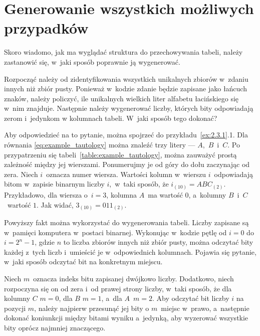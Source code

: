 \documentclass{SGGW-thesis}
\begin{document}
\section{Generowanie wszystkich możliwych przypadków}

\begin{paragraph}{}
    Skoro wiadomo, jak ma wyglądać struktura do przechowywania tabeli, należy zastanowić się, w~jaki sposób poprawnie ją wygenerować.

    Rozpocząć należy od zidentyfikowania wszystkich unikalnych zbiorów w~zdaniu innych niż zbiór pusty. Ponieważ w~kodzie zdanie będzie zapisane jako łańcuch znaków, należy policzyć, ile unikalnych wielkich liter alfabetu łacińskiego się w~nim znajduje. Następnie należy wygenerować liczby, których bity odpowiadają zerom i~jedynkom w kolumnach tabeli. W~jaki sposób tego dokonać?

    Aby odpowiedzieć na to pytanie, można spojrzeć do przykładu~\ref{ex:2.3.1}.1. Dla równania \eqref{eq:example_tautology} można znaleźć trzy litery --- $A$,~$B$~i~$C$. Po przypatrzeniu się tabeli~\ref{table:example_tautology}, można zauważyć prostą zależność między jej wierszami. Ponumerujmy je od góry do dołu zaczynając od zera. Niech $i$~oznacza numer wiersza. Wartości kolumn w~wierszu $i$~odpowiadają bitom w~zapisie binarnym liczby $i$,~w~taki sposób, że $i_{(10)} = ABC_{(2)}$. Przykładowo, dla wiersza o~$i = 3$, kolumna $A$~ma wartość $0$, a~kolumny $B$~i~$C$~wartość $1$. Jak widać, $3_{(10)} = 011_{(2)}$.

    Powyższy fakt można wykorzystać do wygenerowania tabeli. Liczby zapisane są w~pamięci komputera w~postaci binarnej. Wykonując w~kodzie pętlę od $i = 0$ do $i = 2^{n}-1$, gdzie $n$ to liczba zbiorów innych niż zbiór pusty, można odczytać bity każdej z~tych liczb i~umieścić je w~odpowiednich kolumnach. Pojawia się pytanie, w~jaki sposób odczytać bit na konkretnym miejscu.

    Niech $m$~oznacza indeks bitu zapisanej dwójkowo liczby. Dodatkowo, niech rozpoczyna się on od zera i~od prawej strony liczby, w~taki sposób, że dla kolumny $C$ $m=0$, dla $B$ $m=1$, a~dla $A$~$m=2$. Aby odczytać bit liczby $i$ na pozycji $m$, należy najpierw przesunąć jej bity o $m$~miejsc w~prawo, a~następnie dokonać koniunkcji między bitami wyniku a~jedynką, aby wyzerować wszystkie bity oprócz najmniej znaczącego.
\end{paragraph}
\end{document}
